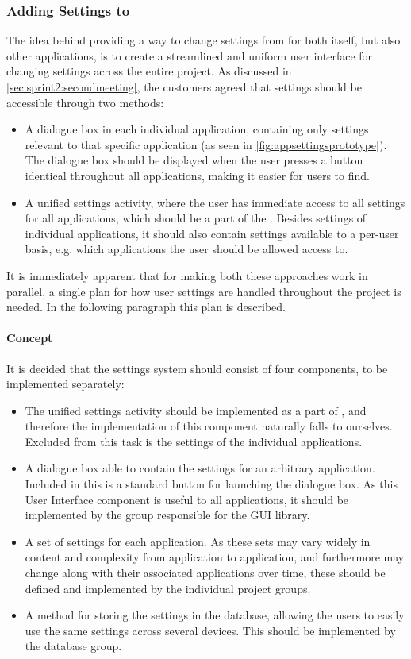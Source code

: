 \subsubsection{Adding Settings to \giraf}
The idea behind providing a way to change settings from \launcher for both itself, but also other \giraf applications, is to create a streamlined and uniform user interface for changing settings across the entire project. 
As discussed in \cref{sec:sprint2:secondmeeting}, the customers agreed that settings should be accessible through two methods:

\begin{itemize}
	\item A dialogue box in each individual application, containing only settings relevant to that specific application (as seen in \cref{fig:appsettingsprototype}). 
	The dialogue box should be displayed when the user presses a button identical throughout all \giraf applications, making it easier for users to find.
	\item A unified settings activity, where the user has immediate access to all settings for all \giraf applications, which should be a part of the \launcher. 
	Besides settings of individual applications, it should also contain settings available to a per-user basis, e.g. which applications the user should be allowed access to.
\end{itemize}

It is immediately apparent that for making both these approaches work in parallel, a single plan for how user settings are handled throughout the \giraf project is needed. 
In the following paragraph this plan is described.

\paragraph{Concept}
It is decided that the settings system should consist of four components, to be implemented separately:

\begin{itemize}
	\item The unified settings activity should be implemented as a part of \launcher, and therefore the implementation of this component naturally falls to ourselves. 
	Excluded from this task is the settings of the individual applications.
	\item A dialogue box able to contain the settings for an arbitrary \giraf application. Included in this is a standard button for launching the dialogue box. 
	As this User Interface component is useful to all applications, it should be implemented by the group responsible for the \giraf GUI library.
	\item A set of settings for each \giraf application.
	As these sets may vary widely in content and complexity from application to application, and furthermore may change along with their associated applications over time, these should be defined and implemented by the individual project groups. 
	\item A method for storing the settings in the database, allowing the users to easily use the same settings across several devices. 
	This should be implemented by the database group. 
\end{itemize}

